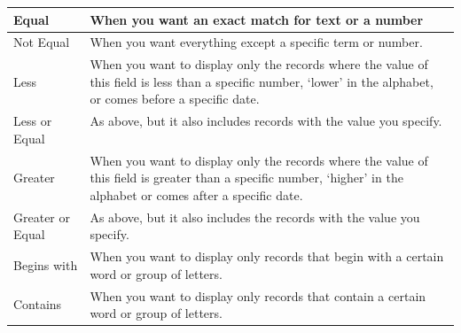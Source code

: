 \documentclass{ctrlo-int-toc}
\begin{document}
\begin{enumerate}
\begin{flushleft}
\tablefirsthead{}
\tablehead{}
\tabletail{}
\tablelasttail{}
\begin{supertabular}{|m{3.046cm}|m{10.915cm}|}
\hline
Equal &
When you want an exact match for text or a number\\\hline
Not Equal &
When you want everything except a specific term or number.\\\hline
Less &
When you want to display only the records where the value of this field is less than a specific number, `lower' in the alphabet, or comes before a specific date. \ \\\hline
Less or Equal &
As above, but it also includes records with the value you specify. \ \\\hline
Greater  &
When you want to display only the records where the value of this field is greater than a specific number, `higher' in the alphabet or comes after a specific date. \ \\\hline
Greater or Equal &
As above, but it also includes the records with the value you specify. \ \\\hline
Begins with &
When you want to display only records that begin with a certain word or group of letters.\\\hline
Contains &
When you want to display only records that contain a certain word or group of letters.\\\hline
\end{supertabular}
\end{flushleft}
\end{enumerate}
\end{document}
